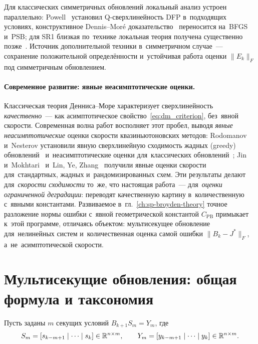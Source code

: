 Для классических симметричных обновлений локальный анализ устроен
параллельно: Powell~\cite{powell1971} установил Q-сверхлинейность DFP
в~подходящих условиях, конструктивное Dennis--Mor\'e
доказательство~\cite{dennis1977,dennis1996} переносится на~BFGS и~PSB;
для SR1 близкая по~технике локальная теория получена существенно
позже~\cite{conn1991}. Источник дополнительной техники в~симметричном
случае~--- сохранение положительной определённости и~устойчивая работа
оценки $\|E_k\|_F$ под симметричным обновлением.

\paragraph{Современное развитие: явные неасимптотические оценки.}
Классическая теория Денниса--Море характеризует сверхлинейность
\emph{качественно}~--- как асимптотическое свойство~\eqref{eq:dm_criterion},
без~явной скорости. Современная волна работ восполняет этот пробел,
выводя \emph{явные неасимптотические} оценки скорости квазиньютоновских
методов: Rodomanov и~Nesterov установили явную сверхлинейную сходимость
жадных (greedy) обновлений~\cite{rodomanov2021greedy} и~неасимптотические
оценки для~классических обновлений~\cite{rodomanov2022rates}; Jin
и~Mokhtari~\cite{jin2023nonasymp} и~Lin, Ye, Zhang~\cite{lin2022explicit}
получили явные оценки скорости для~стандартных, жадных
и~рандомизированных схем. Эти результаты делают для~\emph{скорости
сходимости} то~же, что настоящая работа~--- для~\emph{оценки ограниченной
деградации}: переводят качественную картину в~количественную с~явными
константами. Развиваемое в~гл.~\ref{ch:sp-broyden-theory} точное
разложение нормы ошибки с~явной геометрической константой
$C_{\mathrm{PB}}$ примыкает к~этой программе, отличаясь объектом:
мультисекущее обновление для~нелинейных систем и~количественная оценка
самой ошибки $\|B_k-J^*\|_F$, а~не~асимптотической скорости.

\section{Мультисекущие обновления: общая формула и таксономия}\label{sec:ch1_multisecant}

Пусть заданы $m$ секущих условий $B_{k+1} S_m = Y_m$, где
\[
  S_m = [s_{k-m+1}\mid\cdots\mid s_k] \in \mathbb{R}^{n \times m}, \qquad
  Y_m = [y_{k-m+1}\mid\cdots\mid y_k] \in \mathbb{R}^{n \times m}.
\]



